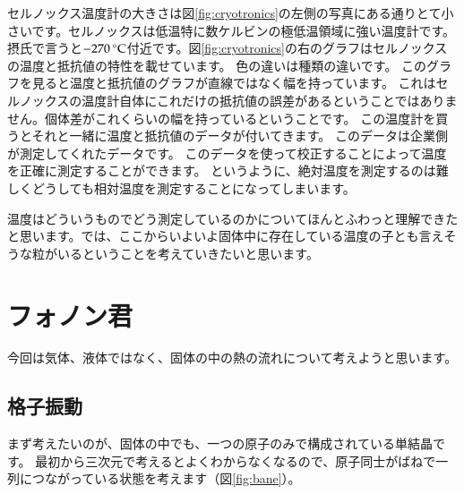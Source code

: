 \documentclass[10pt,b5paper,papersize,dvipdfmx]{jsbook}
\begin{document}
セルノックス温度計の大きさは図\ref{fig:cryotronics}の左側の写真にある通りとて小さいです。セルノックスは低温特に数ケルビンの極低温領域に強い温度計です。
摂氏で言うと$-270\tani{\degreeCelsius}$付近です。図\ref{fig:cryotronics}の右のグラフはセルノックスの温度と抵抗値の特性を載せています。
色の違いは種類の違いです。
このグラフを見ると温度と抵抗値のグラフが直線ではなく幅を持っています。
これはセルノックスの温度計自体にこれだけの抵抗値の誤差があるということではありません。個体差がこれくらいの幅を持っているということです。
この温度計を買うとそれと一緒に温度と抵抗値のデータが付いてきます。
このデータは企業側が測定してくれたデータです。
このデータを使って校正することによって温度を正確に測定することができます。
というように、絶対温度を測定するのは難しくどうしても相対温度を測定することになってしまいます。\par
温度はどういうものでどう測定しているのかについてほんとふわっと理解できたと思います。では、ここからいよいよ固体中に存在している温度の子とも言えそうな粒がいるということを考えていきたいと思います。


\section{フォノン君}
今回は気体、液体ではなく、固体の中の熱の流れについて考えようと思います。

\subsection{格子振動}
まず考えたいのが、固体の中でも、一つの原子のみで構成されている単結晶です。
最初から三次元で考えるとよくわからなくなるので、原子同士がばねで一列につながっている状態を考えます（図\ref{fig:bane}）。\par
\end{document}
